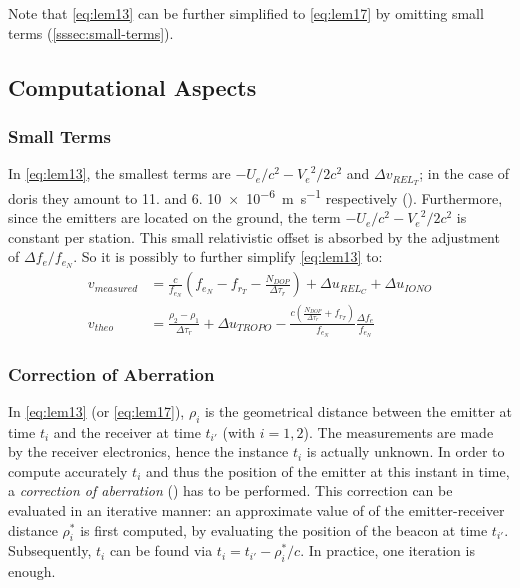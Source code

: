 Note that \autoref{eq:lem13} can be further simplified to \autoref{eq:lem17} by 
omitting small terms (\autoref{sssec:small-terms}).

\subsection{Computational Aspects}\label{ssec:doris-computational-aspects}

\subsubsection{Small Terms}\label{sssec:small-terms}
In \autoref{eq:lem13}, the smallest terms are $-U_e / c^2 - {V_e}^2 / 2 c^2$ and 
$\Delta v_{{REL}_T}$; in the case of \gls{doris} they amount to \num{11.} and 
\num{6.} \SI{10e-6}{\meter\per\second} respectively (\cite{Lemoine2016}). 
Furthermore, since the emitters are located on the ground, the term 
$-U_e / c^2 - {V_e}^2 / 2 c^2$ is constant per station. This small 
relativistic offset is absorbed by the adjustment of $\Delta f_e / f_{e_N}$. 
So it is possibly to further simplify \autoref{eq:lem13} to:
\begin{subequations}\label{eq:lem17}
    \begin{align}
        v_{measured} & = \frac{c}{f_{e_N}} (f_{e_N} - f_{r_T} -
          \frac{N_{DOP}}{\Delta\tau_r}) + 
          \Delta u_{{REL}_C} + \Delta u_{IONO} \label{eq:lem17a}\\
        v_{theo} &= \frac{\rho_2 - \rho_1}{\Delta\tau_r} + \Delta u_{TROPO} - 
          \frac{c(\frac{N_{DOP}}{\Delta\tau_r} + f_{r_T})}{f_{e_N}} 
          \frac{\Delta f_e}{f_{e_N}} \label{eq:lem17b}
    \end{align}
\end{subequations}

\subsubsection{Correction of Aberration}\label{sssec:doris-aberration}
In \autoref{eq:lem13} (or \autoref{eq:lem17}), $\rho _i$ is the geometrical distance 
between the emitter at time $t_i$ and the receiver at time $t_{i'}$ (with $i=1,2$). 
The measurements are made by the receiver electronics, hence the instance $t_i$ is 
actually unknown. In order to compute accurately $t_i$ and thus the position of 
the emitter at this instant in time, a \emph{correction of aberration} (\cite{Lemoine2016}) 
has to be performed. This correction can be evaluated in an iterative manner: an 
approximate value of of the emitter-receiver distance $\rho ^{*} _i$ is first computed, 
by evaluating the position of the beacon at time $t_{i'}$. Subsequently, $t_i$ can be 
found via $t_i = t_{i'} - \rho ^{*} _i / c$. In practice, one iteration is enough.

